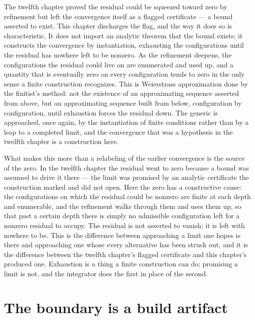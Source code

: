 The twelfth chapter proved the residual could be squeezed toward zero by refinement but left the
convergence itself as a flagged certificate --- a bound asserted to exist. This chapter discharges the
flag, and the way it does so is characteristic. It does not import an analytic theorem that the bound
exists; it constructs the convergence by instantiation, exhausting the configurations until the residual
has nowhere left to be nonzero. As the refinement deepens, the configurations the residual could live on
are enumerated and used up, and a quantity that is eventually zero on every configuration tends to zero
in the only sense a finite construction recognizes. This is Weierstrass approximation done by the
finitist's method: not the existence of an approximating sequence asserted from above, but an
approximating sequence built from below, configuration by configuration, until exhaustion forces the
residual down. The generic is approached, once again, by the instantiation of finite conditions rather
than by a leap to a completed limit, and the convergence that was a hypothesis in the twelfth chapter is
a construction here.

What makes this more than a relabeling of the earlier convergence is the source of the zero. In the
twelfth chapter the residual went to zero because a bound was assumed to drive it there --- the limit was
promised by an analytic certificate the construction marked and did not open. Here the zero has a
constructive cause: the configurations on which the residual could be nonzero are finite at each depth
and enumerable, and the refinement walks through them and uses them up, so that past a certain depth
there is simply no admissible configuration left for a nonzero residual to occupy. The residual is not
asserted to vanish; it is left with nowhere to be. This is the difference between approaching a limit one
hopes is there and approaching one whose every alternative has been struck out, and it is the difference
between the twelfth chapter's flagged certificate and this chapter's produced one. Exhaustion is a thing
a finite construction can do; promising a limit is not, and the integrator does the first in place of
the second.

\section{The boundary is a build artifact}
\label{se:the-boundary-is-a-build-artifact}


